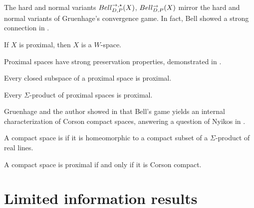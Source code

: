 The hard and normal variants $Bell_{D,P}^{\to,\star}(X)$, $Bell_{D,P}^{\to}(X)$ mirror the
hard and normal variants of Gruenhage's convergence game. In fact, Bell
showed a strong connection in \cite{MR3239205}.

\begin{thm}
  If $X$ is proximal, then $X$ is a $W$-space.
\end{thm}

Proximal spaces have strong preservation properties, demonstrated in
\cite{MR3239205}.

\begin{thm}
  Every closed subspace of a proximal space is proximal.
\end{thm}

\begin{thm}
  Every $\Sigma$-product of proximal spaces is proximal.
\end{thm}

Gruenhage and the author showed in \cite{MR3227201} that Bell's game
yields an internal characterization of Corson compact spaces, answering
a question of Nyikos in \cite{nyikosProximalPreprint}.

\begin{defn}
  A compact space is  if it is homeomorphic to a compact
  subset of a $\Sigma$-product of real lines.
\end{defn}

\begin{thm}
  A compact space is proximal if and only if it is Corson compact.
\end{thm}

\section{Limited information results}



